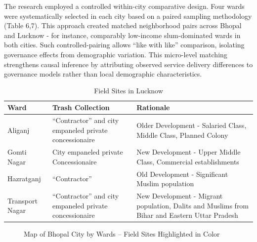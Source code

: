 The research employed a controlled within-city comparative design. Four wards were systematically selected in each city based on a paired sampling methodology (Table 6,7). This approach created matched neighborhood pairs across Bhopal and Lucknow - for instance, comparably low-income slum-dominated wards in both cities. Such controlled-pairing allows ``like with like'' comparison, isolating governance effects from demographic variation. This micro-level matching strengthens causal inference by attributing observed service delivery differences to governance models rather than local demographic characteristics.

\begin{table}[htbp]
\centering
\caption{Field Sites in Lucknow}
\begin{tabular}{lll}
\hline
\textbf{Ward} & \textbf{Trash Collection} & \textbf{Rationale} \\
\hline
Aliganj & ``Contractor'' and city empaneled private concessionaire & Older Development - Salaried Class, Middle Class, Planned Colony \\
\hline
Gomti Nagar & City empaneled private Concessionaire & New Development - Upper Middle Class, Commercial establishments \\
\hline
Hazratganj & ``Contractor'' & Old Development - Significant Muslim population \\
\hline
Transport Nagar & ``Contractor'' and city empaneled private concessionaire & New Development - Migrant population, Dalits and Muslims from Bihar and Eastern Uttar Pradesh \\
\hline
\end{tabular}
\label{tab:lucknow}
\end{table}

\begin{figure}[htbp]
\centering
\caption{Map of Bhopal City by Wards – Field Sites Highlighted in Color}
\label{fig:bhopal_map}
\end{figure}

